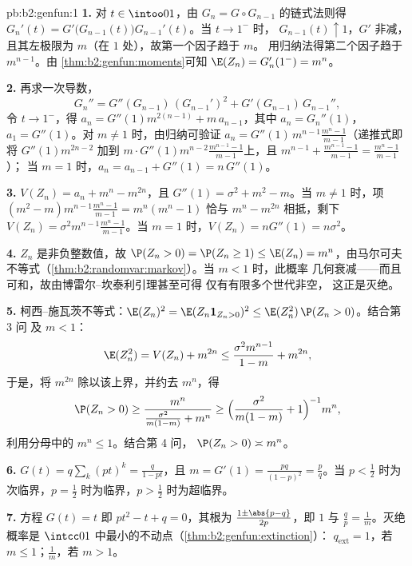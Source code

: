 \begin{solution}{pb:b2:genfun:1}
\textbf{1.} 对 $t \in \intoo01$，由 $G_n = G
\circ G_{n-1}$ 的链式法则得 $G_n'(t) =
G'\bigl(G_{n-1}(t)\bigr)G_{n-1}'(t)$。当 $t \to 1^-$ 时，
$G_{n-1}(t) \uparrow 1$，$G'$ 非减，
且其左极限为 $m$（在 $1$ 处），故第一个因子趋于 $m$。
用归纳法得第二个因子趋于 $m^{n-1}$。由
\cref{thm:b2:genfun:moments}可知 $\E(Z_n) = G_n'(1^-) = m^n$。

\textbf{2.} 再求一次导数，
\[
G_n'' = G''(G_{n-1})\,(G_{n-1}')^2 +
G'(G_{n-1})\,G_{n-1}'',
\]
令 $t \to 1^-$，得 $a_n = G''(1)m^{2(n-1)} + m\,
a_{n-1}$，其中 $a_n = G_n''(1)$，$a_1 = G''(1)$。对 $m \neq
1$ 时，由归纳可验证 $a_n = G''(1)\,m^{n-1}
\frac{m^n - 1}{m - 1}$（递推式即将 $G''(1)m^{2n-2}$
加到 $m\cdot G''(1)m^{n-2}\frac{m^{n-1}-1}{m-1}$上，且
$m^{n-1} + \frac{m^{n-1}-1}{m-1} = \frac{m^n - 1}{m-1}$）；
当 $m = 1$ 时，$a_n = a_{n-1} + G''(1) = n\,G''(1)$。

\textbf{3.} $V(Z_n) = a_n + m^n - m^{2n}$，且 $G''(1) =
\sigma^2 + m^2 - m$。当 $m \neq 1$ 时，项 $(m^2 -
m)m^{n-1}\frac{m^n-1}{m-1} = m^n(m^n - 1)$ 恰与 $m^n -
m^{2n}$ 相抵，剩下 $V(Z_n) =
\sigma^2m^{n-1}\frac{m^n-1}{m-1}$。当 $m = 1$ 时，$V(Z_n) =
nG''(1) = n\sigma^2$。

\textbf{4.} $Z_n$ 是非负整数值，故
$\P(Z_n > 0) = \P(Z_n \geq 1) \leq \E(Z_n) = m^n$，由马尔可夫
不等式（\cref{thm:b2:randomvar:markov}）。当 $m < 1$ 时，此概率
几何衰减——而且可和，故由博雷尔–坎泰利引理甚至可得
仅有有限多个世代非空，
这正是灭绝。

\textbf{5.} 柯西–施瓦茨不等式：$\E(Z_n)^2 = \E(Z_n\mathbf
1_{Z_n>0})^2 \leq \E(Z_n^2)\,\P(Z_n > 0)$。结合第 3 问
及 $m < 1$：
\[
\E(Z_n^2) = V(Z_n) + m^{2n}
\leq \frac{\sigma^2m^{n-1}}{1-m} + m^{2n},
\]
于是，将 $m^{2n}$ 除以该上界，并约去
$m^n$，得
\[
\P(Z_n > 0) \geq \frac{m^n}{\frac{\sigma^2}{m(1-m)} + m^n}
\geq \Bigl(\frac{\sigma^2}{m(1-m)} + 1\Bigr)^{-1}m^n ,
\]
利用分母中的 $m^n \leq 1$。结合第 4 问，
$\P(Z_n > 0) \asymp m^n$。

\textbf{6.} $G(t) = q\sum_k(pt)^k = \frac{q}{1 - pt}$，且 $m
= G'(1) = \frac{pq}{(1-p)^2} = \frac pq$。当 $p
< \frac12$ 时为次临界，$p = \frac12$ 时为临界，$p
> \frac12$ 时为超临界。

\textbf{7.} 方程 $G(t) = t$ 即 $pt^2 - t + q = 0$，其根为
$\frac{1 \pm \abs{p - q}}{2p}$，即 $1$ 与 $\frac qp =
\frac1m$。灭绝概率是
$\intcc01$ 中最小的不动点（\cref{thm:b2:genfun:extinction}）：
$q_{\mathrm{ext}} = 1$，若 $m \leq 1$；$\frac1m$，若 $m >
1$。


\end{solution}
